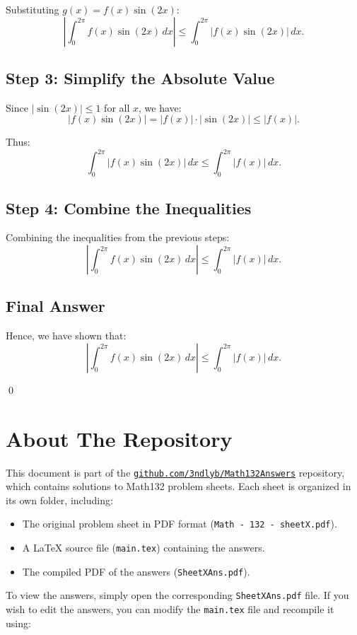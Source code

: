 \documentclass{article}
\begin{document}
Substituting $g(x) = f(x)\sin(2x)$:
\[
\left| \int_0^{2\pi} f(x)\sin(2x) \, dx \right| \leq \int_0^{2\pi} |f(x)\sin(2x)| \, dx.
\]

\subsection*{Step 3: Simplify the Absolute Value}
Since $|\sin(2x)| \leq 1$ for all $x$, we have:
\[
|f(x)\sin(2x)| = |f(x)| \cdot |\sin(2x)| \leq |f(x)|.
\]

Thus:
\[
\int_0^{2\pi} |f(x)\sin(2x)| \, dx \leq \int_0^{2\pi} |f(x)| \, dx.
\]

\subsection*{Step 4: Combine the Inequalities}
Combining the inequalities from the previous steps:
\[
\left| \int_0^{2\pi} f(x)\sin(2x) \, dx \right| \leq \int_0^{2\pi} |f(x)| \, dx.
\]

\subsection*{Final Answer}
Hence, we have shown that:
\[
\boxed{\left| \int_0^{2\pi} f(x)\sin(2x) \, dx \right| \leq \int_0^{2\pi} |f(x)| \, dx.}
\]

\qed
\section*{About The Repository}

This document is part of the \href{https://github.com/3ndlyb/Math132Answers}{\texttt{github.com/3ndlyb/Math132Answers}} repository, which contains solutions to Math132 problem sheets. Each sheet is organized in its own folder, including:

\begin{itemize}
    \item The original problem sheet in PDF format (\texttt{Math - 132 - sheetX.pdf}).
    \item A \LaTeX{} source file (\texttt{main.tex}) containing the answers.
    \item The compiled PDF of the answers (\texttt{SheetXAns.pdf}).
\end{itemize}

To view the answers, simply open the corresponding \texttt{SheetXAns.pdf} file. If you wish to edit the answers, you can modify the \texttt{main.tex} file and recompile it using:
\end{document}
